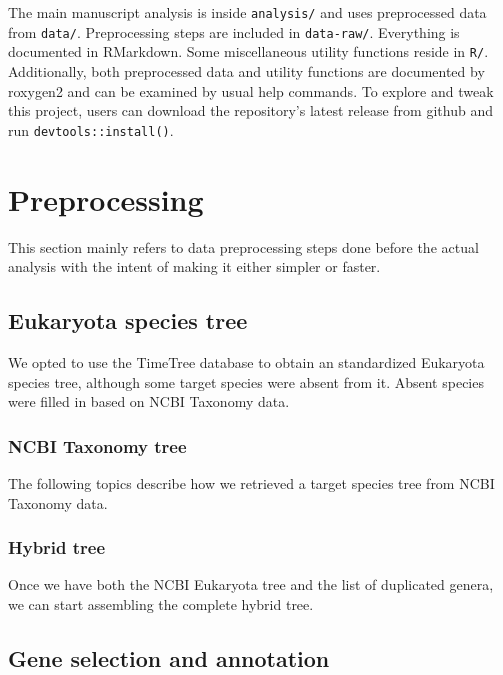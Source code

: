 \documentclass[
]{article}
\begin{document}
The main manuscript analysis is inside \texttt{analysis/} and uses
preprocessed data from \texttt{data/}. Preprocessing steps are included
in \texttt{data-raw/}. Everything is documented in RMarkdown. Some
miscellaneous utility functions reside in \texttt{R/}. Additionally,
both preprocessed data and utility functions are documented by roxygen2
and can be examined by usual help commands. To explore and tweak this
project, users can download the repository's latest release from github
and run \texttt{devtools::install()}.

\hypertarget{preprocessing}{%
\section{Preprocessing}\label{preprocessing}}

This section mainly refers to data preprocessing steps done before the
actual analysis with the intent of making it either simpler or faster.

\hypertarget{eukaryota-species-tree}{%
\subsection{Eukaryota species tree}\label{eukaryota-species-tree}}

We opted to use the TimeTree database to obtain an standardized
Eukaryota species tree, although some target species were absent from
it. Absent species were filled in based on NCBI Taxonomy data.

\hypertarget{ncbi-taxonomy-tree}{%
\subsubsection{NCBI Taxonomy tree}\label{ncbi-taxonomy-tree}}

The following topics describe how we retrieved a target species tree
from NCBI Taxonomy data. 

\hypertarget{hybrid-tree}{%
\subsubsection{Hybrid tree}\label{hybrid-tree}}

Once we have both the NCBI Eukaryota tree and the list of duplicated
genera, we can start assembling the complete hybrid tree.


\hypertarget{gene-selection-and-annotation}{%
\subsection{Gene selection and
annotation}\label{gene-selection-and-annotation}}
\end{document}

